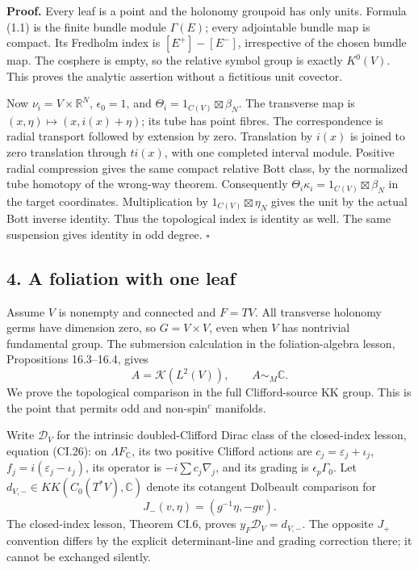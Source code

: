 \documentclass[
  11pt,
]{article}
\begin{document}
\textbf{Proof.} Every leaf is a point and the holonomy groupoid has only
units. Formula (1.1) is the finite bundle module \(\Gamma(E)\); every
adjointable bundle map is compact. Its Fredholm index is
\([E^+]-[E^-]\), irrespective of the chosen bundle map. The cosphere is
empty, so the relative symbol group is exactly \(K^0(V)\). This proves
the analytic assertion without a fictitious unit covector.

Now \(\nu_i=V\times\mathbb R^N\), \(\epsilon_0=1\), and
\(\Theta_i=1_{C(V)}\boxtimes\beta_N\). The transverse map is
\((x,\eta)\mapsto(x,i(x)+\eta)\); its tube has point fibres. The
correspondence is radial transport followed by extension by zero.
Translation by \(i(x)\) is joined to zero translation through
\(t i(x)\), with one completed interval module. Positive radial
compression gives the same compact relative Bott class, by the
normalized tube homotopy of the wrong-way theorem. Consequently
\(\Theta_i\kappa_i=1_{C(V)}\boxtimes\beta_N\) in the target coordinates.
Multiplication by \(1_{C(V)}\boxtimes\eta_N\) gives the unit by the
actual Bott inverse identity. Thus the topological index is identity as
well. The same suspension gives identity in odd degree. \(\square\)

\subsection{4. A foliation with one
leaf}\label{a-foliation-with-one-leaf}

Assume \(V\) is nonempty and connected and \(F=TV\). All transverse
holonomy germs have dimension zero, so \(G=V\times V\), even when \(V\)
has nontrivial fundamental group. The submersion calculation in the
foliation-algebra lesson, Propositions 16.3--16.4, gives \[
 A=\mathcal K(L^2(V)),\qquad A\sim_M\mathbb C.
 \tag{4.1}
\] We prove the topological comparison in the full Clifford-source KK
group. This is the point that permits odd and non-spin\(^{c}\)
manifolds.

Write \(\mathscr D_V\) for the intrinsic doubled-Clifford Dirac class of
the closed-index lesson, equation (CI.26): on
\(\Lambda F_{\mathbb{C}}\), its two positive Clifford actions are
\(c_j=\varepsilon_j+\iota_j\), \(f_j=i(\varepsilon_j-\iota_j)\), its
operator is \(-i\sum c_j\nabla_j\), and its grading is
\(\epsilon_p\Gamma_0\). Let \(d_{V,-}\in KK(C_0(T^*V),\mathbb C)\)
denote its cotangent Dolbeault comparison for \[
 J_-(v,\eta)=(g^{-1}\eta,-gv).
\] The closed-index lesson, Theorem CI.6, proves
\(y_F\mathscr D_V=d_{V,-}\). The opposite \(J_+\) convention differs by
the explicit determinant-line and grading correction there; it cannot be
exchanged silently.
\end{document}
